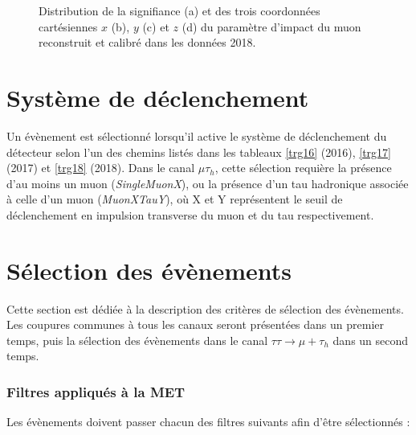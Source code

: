 \begin{figure}[!ht]
\begin{subfigure}[b]{0.33\linewidth}
    \caption{} 
    \vspace{0.5ex}
  \end{subfigure}
    \caption{Distribution de la signifiance (a) et des trois coordonnées cartésiennes $x$ (b), $y$ (c) et $z$ (d) du paramètre d'impact du muon reconstruit et calibré dans les données 2018.}
    \label{IPxyz}
\end{figure}


\section{Système de déclenchement}

Un évènement est sélectionné lorsqu'il active le système de déclenchement du détecteur selon l'un des chemins listés dans les tableaux \ref{trg16} (2016), \ref{trg17} (2017) et \ref{trg18} (2018). Dans le canal $\mu\tau_h$, cette sélection requière la présence d'au moins un muon (\textit{SingleMuonX}), ou la présence d'un tau hadronique associée à celle d'un muon (\textit{MuonXTauY}), où X et Y représentent le seuil de déclenchement en impulsion transverse du muon et du tau respectivement. 





\section{Sélection des évènements}

Cette section est dédiée à la description des critères de sélection des évènements. Les coupures communes à tous les canaux seront présentées dans un premier temps, puis la sélection des évènements dans le canal $\tau\tau\rightarrow\mu+\tau_h$ dans un second temps.

\subsubsection{ Filtres appliqués à la MET}

Les évènements doivent passer chacun des filtres suivants afin d'être sélectionnés :


